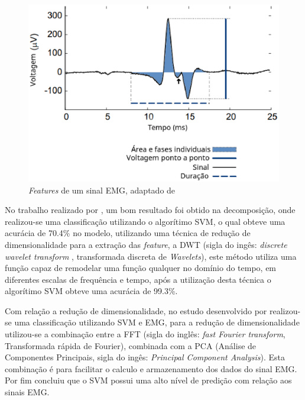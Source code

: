 \begin{figure}[!htb]
    \centering
     \includegraphics[width=1\textwidth]{figuras/featuresEMG.eps}
     \caption{\textit{Features} de um sinal EMG, adaptado de }
     \label{featuresEMG}
 \end{figure}
 
No trabalho realizado por , um bom resultado foi obtido na decomposição, onde realizou-se uma classificação utilizando o algorítimo SVM, o qual obteve uma acurácia de 70.4\% no modelo, utilizando uma técnica de redução de dimensionalidade para a extração das \textit{feature}, a DWT (sigla do ingês: \textit{discrete wavelet transform }, transformada discreta de \textit{Wavelets}), este método utiliza uma função capaz de remodelar uma função qualquer no domínio do tempo, em diferentes escalas de frequência e tempo, após a utilização desta técnica o algorítimo SVM obteve uma acurácia de 99.3\%.

Com relação a redução de dimensionalidade, no estudo desenvolvido por  realizou-se uma classificação utilizando SVM e EMG, para a redução de dimensionalidade utilizou-se a combinação entre a FFT (sigla do inglês: \textit{fast Fourier transform}, Transformada rápida de Fourier), combinada com a PCA (Análise de Componentes Principais, sigla do ingês: \textit{Principal Component Analysis}). Esta combinação é para facilitar o calculo e armazenamento dos dados do sinal EMG. Por fim  concluiu que o SVM possui uma alto nível de predição com relação aos sinais EMG.

